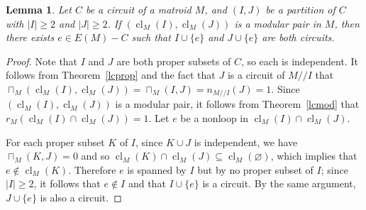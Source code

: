 \documentclass{amsart}
\theoremstyle{plain}
\newtheorem{lemma}[theorem]{Lemma}
\theoremstyle{definition}
\newcommand{\dcon}{/ \!\! /}
\DeclareMathOperator{\cl}{cl}
\newcommand{\es}{\varnothing}
\renewcommand{\ge}{\geqslant}
\renewcommand{\ss}{\subseteq}
\begin{document}
\begin{lemma}\label{modcircuit}
  Let $C$ be a circuit of a matroid $M$, and $(I,J)$ be a partition of $C$ with $|I| \ge 2$ and $|J| \ge 2$. 
  If $(\cl_M(I), \cl_M(J))$ is a modular pair in $M$, then there exists $e \in E(M) - C$ such that $I \cup \{e\}$ and $J \cup \{e\}$
  are both circuits. 
\end{lemma}
\begin{proof}
  Note that $I$ and $J$ are both proper subsets of $C$, so each is independent. It follows from Theorem~\ref{lcprop}
  and the fact that $J$ is a circuit of $M \dcon I$ that 
  $\sqcap_M(\cl_M(I), \cl_M(J)) = \sqcap_M(I,J) = n_{M \dcon I}(J) = 1$. 
  Since $(\cl_M(I), \cl_M(J))$ is a modular pair, it follows from Theorem~\ref{lcmod} that $r_M(\cl_M(I) \cap \cl_M(J)) = 1$. 
  Let $e$ be a nonloop in $\cl_M(I) \cap \cl_M(J)$. 

  For each proper subset $K$ of $I$, since $K \cup J$ is independent, we have $\sqcap_M(K,J) = 0$ 
  and so $\cl_M(K) \cap \cl_M(J) \ss \cl_M(\es)$, which implies that $e \notin \cl_M(K)$. 
  Therefore $e$ is spanned by $I$ but by no proper subset of $I$; since $|I| \ge 2$, it follows that $e \notin I$ and that $I \cup \{e\}$ is a circuit. 
  By the same argument, $J \cup \{e\}$ is also a circuit. 
\end{proof}
\end{document}
